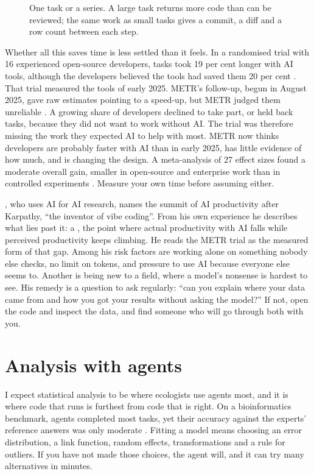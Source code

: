 \begin{figure}[htbp]
\centering
{}
\caption{One task or a series. A large task returns more code than can be
reviewed; the same work as small tasks gives a commit, a diff and a row count
between each step.}
\label{fig:tasksize}
\end{figure}

Whether all this saves time is less settled than it feels. In a randomised
trial with 16 experienced open-source developers, tasks took 19 per cent longer
with AI tools, although the developers believed the tools had saved them 20 per
cent \parencite{becker2025metr}. That trial measured the tools of early 2025.
METR's follow-up, begun in August 2025, gave raw estimates pointing to a
speed-up, but METR judged them unreliable \parencite{becker2026uplift}. A
growing share of developers declined to take part, or held back tasks,
because they did not want to work without AI. The trial was therefore missing
the work they expected AI to help with most. METR now thinks developers are
probably faster with AI than in early 2025, has little evidence of how much,
and is changing the design. A meta-analysis of 27 effect sizes found a
moderate overall gain, smaller in open-source and enterprise work than in
controlled experiments \parencite{maier2026metaanalysis}. Measure your own time
before assuming either.

\textcite{jiralerspong2026slopcliff}, who uses AI for AI research, names the
summit of AI productivity after Karpathy, ``the inventor of vibe coding''.
From his own experience he describes what lies past it: a ,
the point where actual productivity with AI falls while perceived
productivity keeps climbing. He reads the METR trial as the measured form of
that gap. Among his risk factors are working alone on something nobody else
checks, no limit on tokens, and pressure to use AI because everyone else
seems to. Another is being new to a field, where a model's nonsense is
hardest to see. His remedy is a question to ask regularly: ``can you explain
where your data came from and how you got your results without asking the
model?'' If not, open the code and inspect the data, and find someone who
will go through both with you.

\section{Analysis with agents}
\label{sec:analysis}

I expect statistical analysis to be where ecologists use agents most, and it
is where code that runs is furthest from code that is right. On a
bioinformatics benchmark, agents completed most tasks, yet their accuracy
against the experts' reference answers was only moderate
\parencite{guo2026promptbio}. Fitting a model means choosing an error
distribution, a link function, random effects, transformations and a rule
for outliers. If you have not made those choices, the agent will, and it can
try many alternatives in minutes.

